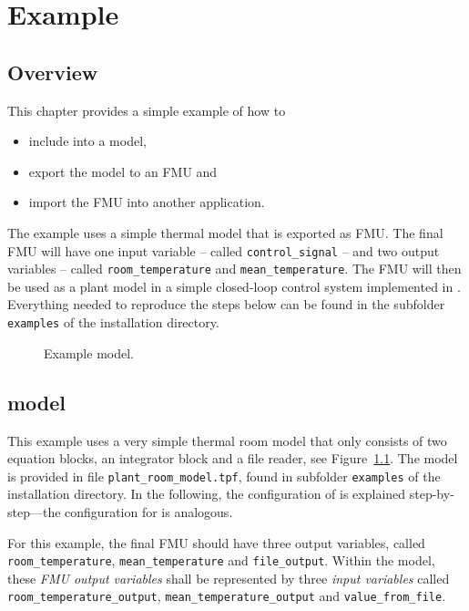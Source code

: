 \chapter{Example}

\section{Overview}

This chapter provides a simple example of how to
\begin{itemize}
  \item include \type into a \trnsys model,
  \item export the model to an FMU and
  \item import the FMU into another application.
\end{itemize}

The example uses a simple thermal model that is exported as FMU.
The final FMU will have one input variable -- called \verb!control_signal! -- and two output variables -- called \verb!room_temperature! and \verb!mean_temperature!.
The FMU will then be used as a plant model in a simple closed-loop control system implemented in \href{https://en.wikipedia.org/wiki/Dymola}{\dymola}.
Everything needed to reproduce the steps below can be found in the subfolder \texttt{examples} of the installation directory.

\begin{figure}[h!]
\caption{Example \trnsys model.}
\label{fig:trnsys_model_example}
\end{figure}


\section{\trnsys model}

This example uses a very simple thermal room model that only consists of two equation blocks, an integrator block and a file reader, see Figure~\ref{fig:trnsys_model_example}.
The model is provided in file \verb!plant_room_model.tpf!, found in subfolder \verb!examples! of the installation directory.
In the following, the configuration of \typeb is explained step-by-step---the configuration for \typea is analogous.

For this example, the final FMU should have three output variables, called \texttt{room\_temperature}, \texttt{mean\_temperature} and \texttt{file\_output}.
Within the \trnsys model, these \emph{FMU output variables} shall be represented by three \emph{\typeb input variables} called \texttt{room\_temperature\_output}, \texttt{mean\_temperature\_output} and \texttt{value\_from\_file}.

